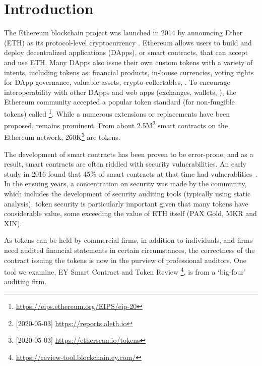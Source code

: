 
\section{Introduction}
\label{sect:introduction}

The Ethereum blockchain project was launched in 2014 by announcing Ether (ETH) as its protocol-level cryptocurrency \cite{EthGit,EIP150}. Ethereum allows users to build and deploy decentralized applications (DApps), or smart contracts, that can accept and use ETH. Many DApps also issue their own custom tokens with a variety of intents, including tokens as: financial products, in-house currencies, voting rights for DApp governance, valuable assets, crypto-collectables, \etc. To encourage interoperability with other DApps and web apps (exchanges, wallets, \etc), the Ethereum community accepted a popular token standard (for non-fungible tokens) called \erc\footnote{\url{https://eips.ethereum.org/EIPS/eip-20}}. While a numerous \erc extensions or replacements have been proposed, \erc remains prominent. From about 2.5M\footnote{[2020-05-03] \url{https://reports.aleth.io}} smart contracts on the Ethereum network, 260K\footnote{[2020-05-03] \url{https://etherscan.io/tokens}} are \erc tokens.

The development of smart contracts has been proven to be error-prone, and as a result, smart contracts are often riddled with security vulnerabilities. An early study in 2016 found that 45\% of smart contracts at that time had vulnerablities~\cite{MakSm}. In the ensuing years, a concentration on security was made by the community, which includes the development of security auditing tools (typically using static analysis). \erc token security is particularly important given that many tokens have considerable value, some exceeding the value of ETH itself (\eg PAX Gold, MKR and XIN). 

As tokens can be held by commercial firms, in addition to individuals, and firms need audited financial statements in certain circumstances, the correctness of the contract issuing the tokens is now in the purview of professional auditors. One tool we examine, EY {\chg Smart Contract and Token Review \footnote{\url{https://review-tool.blockchain.ey.com/}}}, is from a `big-four' auditing firm. 

